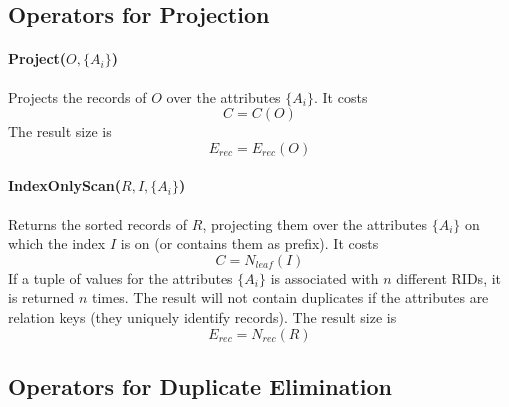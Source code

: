 \subsection{Operators for Projection}

\paragraph{Project($O, \{A_i\}$)}
Projects the records of $O$ over the attributes $\{A_i\}$. It costs
\begin{equation*}
    C = C(O)
\end{equation*}
The result size is
\begin{equation*}
    E_{rec} = E_{rec}(O)
\end{equation*}

\paragraph{IndexOnlyScan($R, I, \{A_i\}$)}
Returns the sorted records of $R$, projecting them over the attributes $\{A_i\}$ on which the index $I$ is on (or contains them as prefix). It costs
\begin{equation*}
    C = N_{leaf}(I)
\end{equation*}
If a tuple of values for the attributes $\{A_i\}$ is associated with $n$ different RIDs, it is returned $n$ times. The result will not contain duplicates if the attributes are relation keys (they uniquely identify records). The result size is
\begin{equation*}
    E_{rec} = N_{rec}(R)
\end{equation*}

\subsection{Operators for Duplicate Elimination}

